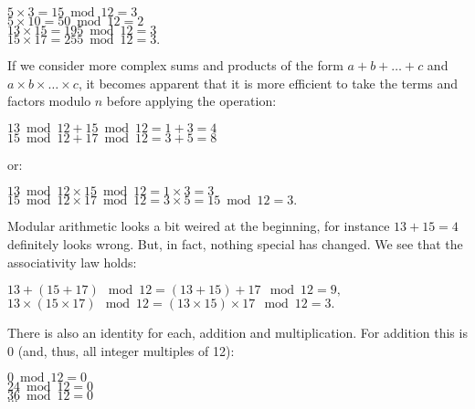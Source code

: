 \documentclass{scrreprt}
\begin{document}
$ 5 \times  3 =  15 \bmod 12 = 3$\\
$ 5 \times 10 =  50 \bmod 12 = 2$\\
$13 \times 15 = 195 \bmod 12 = 3$\\
$15 \times 17 = 255 \bmod 12 = 3.$

If we consider more complex sums and products
of the form $a + b + \dots + c$ and
$a \times b \times \dots \times c$,
it becomes apparent that it is more efficient
to take the terms and factors modulo $n$
before applying the operation:

$13 \bmod 12 + 15 \bmod 12 = 1 + 3 = 4$\\
$15 \bmod 12 + 17 \bmod 12 = 3 + 5 = 8$

or:

$13 \bmod 12 \times 15 \bmod 12 = 1 \times 3 = 3$\\
$15 \bmod 12 \times 17 \bmod 12 = 3 \times 5 = 15 \bmod 12 = 3.$


Modular arithmetic looks a bit weired at the beginning,
for instance $13 + 15 = 4$ definitely looks wrong.
But, in fact, nothing special has changed.
We see that the associativity law holds:

$13 + (15 + 17) \mod 12 = (13 + 15) + 17 \mod 12 = 9,$\\
$13 \times (15 \times 17) \mod 12 = (13 \times 15) \times 17 \mod 12 = 3.$

There is also an identity for each, addition and multiplication.
For addition this is 0 (and, thus, all integer multiples of 12):

$ 0 \bmod 12 = 0$\\
$24 \bmod 12 = 0$\\
$36 \bmod 12 = 0$\\
$\dots$
\end{document}

